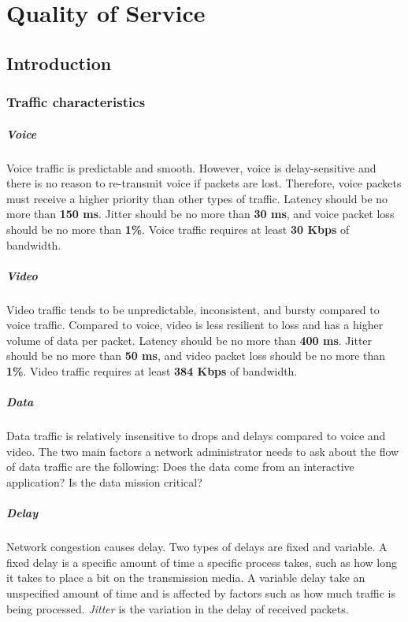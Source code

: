 \chapter{Quality of Service}

\section{Introduction}

\subsection{Traffic characteristics}

\paragraph{Voice}Voice traffic is predictable and smooth. However, voice is delay-sensitive and there is no reason to re-transmit voice if packets are lost. Therefore, voice packets must receive a higher priority than other types of traffic. Latency should be no more than \textbf{150 ms}. Jitter should be no more than \textbf{30 ms}, and voice packet loss should be no more than \textbf{1\%}. Voice traffic requires at least \textbf{30 Kbps} of bandwidth.

\paragraph{Video}Video traffic tends to be unpredictable, inconsistent, and bursty compared to voice traffic. Compared to voice, video is less resilient to loss and has a higher volume of data per packet. Latency should be no more than \textbf{400 ms}. Jitter should be no more than \textbf{50 ms}, and video packet loss should be no more than \textbf{1\%}. Video traffic requires at least \textbf{384 Kbps} of bandwidth.

\paragraph{Data}Data traffic is relatively insensitive to drops and delays compared to voice and video. The two main factors a network administrator needs to ask about the flow of data traffic are the following: Does the data come from an interactive application? Is the data mission critical?

\paragraph{Delay} Network congestion causes delay. Two types of delays are fixed and variable. A fixed delay is a specific amount of time a specific process takes, such as how long it takes to place a bit on the transmission media. A variable delay take an unspecified amount of time and is affected by factors such as how much traffic is being processed. \emph{Jitter} is the variation in the delay of received packets.

